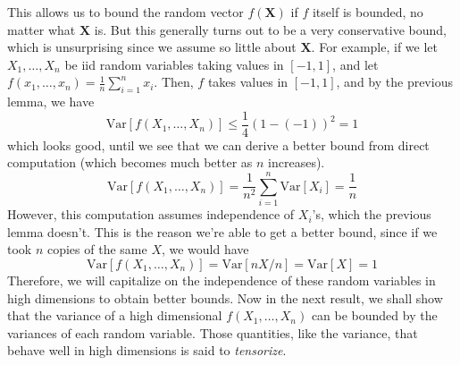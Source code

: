 \documentclass{article}
\theoremstyle{definition}
\theoremstyle{remark}
\theoremstyle{definition}
\begin{document}
  This allows us to bound the random vector $f(\mathbf{X})$ if $f$ itself is bounded, no matter what $\mathbf{X}$ is. But this generally turns out to be a very conservative bound, which is unsurprising since we assume so little about $\mathbf{X}$. For example, if we let $X_1, \ldots, X_n$ be iid random variables taking values in $[-1, 1]$, and let $f(x_1, \ldots, x_n) = \frac{1}{n} \sum_{i=1}^n x_i$. Then, $f$ takes values in $[-1, 1]$, and by the previous lemma, we have
  \[\mathrm{Var}[f(X_1, \ldots, X_n)] \leq \frac{1}{4} (1 - (-1))^2 = 1\]
  which looks good, until we see that we can derive a better bound from direct computation (which becomes much better as $n$ increases). 
  \[\mathrm{Var}[f(X_1, \ldots, X_n)] = \frac{1}{n^2} \sum_{i=1}^n \mathrm{Var}[X_i] = \frac{1}{n}\]
  However, this computation assumes independence of $X_i$'s, which the previous lemma doesn't. This is the reason we're able to get a better bound, since if we took $n$ copies of the same $X$, we would have 
  \[\mathrm{Var}[f(X_1, \ldots, X_n)] = \mathrm{Var}[n X / n] = \mathrm{Var}[X] = 1\]
  Therefore, we will capitalize on the independence of these random variables in high dimensions to obtain better bounds. Now in the next result, we shall show that the variance of a high dimensional $f(X_1, \ldots, X_n)$ can be bounded by the variances of each random variable. Those quantities, like the variance, that behave well in high dimensions is said to \textit{tensorize}. 
\end{document}
